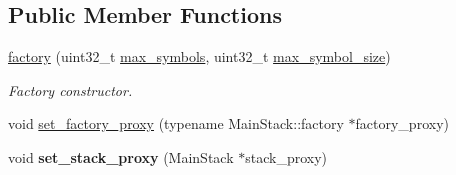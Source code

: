 \subsection*{Public Member Functions}
\begin{DoxyCompactItemize}
\item 
\hyperlink{classkodo_1_1proxy__layer_1_1factory_a6183c39889bf4e1e78f0f6327290ec6b}{factory} (uint32\-\_\-t \hyperlink{classkodo_1_1proxy__layer_1_1factory_ad4bdf285390019f38ee1aed95b90dce0}{max\-\_\-symbols}, uint32\-\_\-t \hyperlink{classkodo_1_1proxy__layer_1_1factory_a7d3e800a3de78517fe6e33879a16ede9}{max\-\_\-symbol\-\_\-size})
\begin{DoxyCompactList}\small\item\em Factory constructor. \end{DoxyCompactList}\item 
void \hyperlink{classkodo_1_1proxy__layer_1_1factory_a7166e544df9b64bd67dc828d07e805ba}{set\-\_\-factory\-\_\-proxy} (typename Main\-Stack\-::factory $\ast$factory\-\_\-proxy)
\item 
\hypertarget{classkodo_1_1proxy__layer_1_1factory_acafca2edd56cc797a31fedababc7d7e8}{void {\bfseries set\-\_\-stack\-\_\-proxy} (Main\-Stack $\ast$stack\-\_\-proxy)}\label{classkodo_1_1proxy__layer_1_1factory_acafca2edd56cc797a31fedababc7d7e8}


\end{DoxyCompactItemize}
